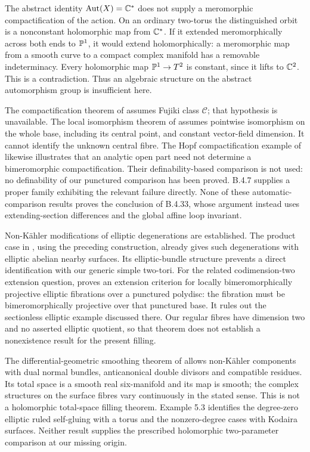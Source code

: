 \begin{remark}
The abstract identity $\operatorname{Aut}(X)=\mathbb C^*$ does not supply a
meromorphic compactification of the action. On an ordinary
two-torus the distinguished orbit is a nonconstant holomorphic
map from $\mathbb C^*$. If it extended meromorphically across both
ends to $\mathbb P^1$, it would extend holomorphically: a
meromorphic map from a smooth curve to a compact complex
manifold has a removable indeterminacy. Every holomorphic
map $\mathbb P^1\to T^2$ is constant, since it lifts to $\mathbb C^2$.
This is a contradiction. Thus an algebraic structure on the
abstract automorphism group is insufficient here.

The compactification theorem of
\citet[Theorem 1.2]{BiliottiGhigi2021Root} assumes Fujiki
class $\mathcal C$; that hypothesis is unavailable.
The local isomorphism theorem of
\citet[Theorem 3]{Meersseman2011Root} assumes pointwise
isomorphism on the whole base, including its central point,
and constant vector-field dimension. It cannot identify the
unknown central fibre. The Hopf compactification example of
\citet[Example 1]{KatzarkovEtAl2025Root} likewise illustrates
that an analytic open part need not determine a bimeromorphic
compactification. Their definability-based comparison is not
used: no definability of our punctured comparison has been
proved. B.4.7 supplies a proper family exhibiting the relevant
failure directly. None of these automatic-comparison results
proves the conclusion of B.4.33, whose argument instead uses
extending-section differences and the global affine loop invariant.

Non-K\"ahler modifications of elliptic degenerations are
established. The product case in
\citet[Section 3, Example 3.4(1)]{Fujimoto1988Root}, using
the preceding construction, already gives such degenerations
with elliptic abelian nearby surfaces. Its elliptic-bundle
structure prevents a direct identification with our generic
simple two-tori. For the related codimension-two extension
question, \citet[Theorem 7.1.3]{Nakayama2002Root} proves an
extension criterion for locally bimeromorphically projective
elliptic fibrations over a punctured polydisc: the fibration
must be bimeromorphically projective over that punctured base.
It rules out the sectionless elliptic example discussed there.
Our regular fibres have dimension two and no asserted elliptic
quotient, so that theorem does not establish a nonexistence
result for the present filling.

The differential-geometric smoothing theorem of
\citet[Theorem 5.5, pp.~882--883]{Doi2009Root} allows
non-K\"ahler components with dual normal bundles,
anticanonical double divisors and compatible residues.
Its total space is a smooth real six-manifold and its
map is smooth; the complex structures on the surface
fibres vary continuously in the stated sense.
This is not a holomorphic total-space filling theorem.
Example 5.3 identifies the degree-zero elliptic ruled
self-gluing with a torus and the nonzero-degree cases
with Kodaira surfaces. Neither result supplies the
prescribed holomorphic two-parameter comparison at our
missing origin.
\end{remark}
